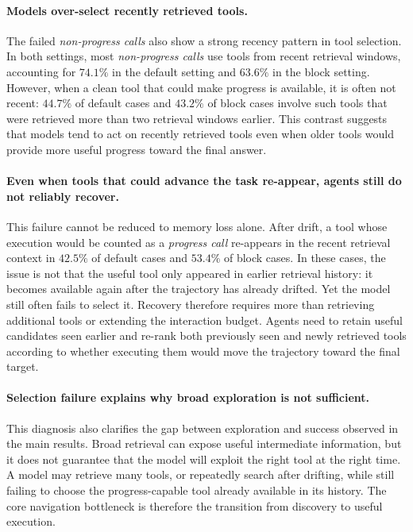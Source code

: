 \paragraph{Models over-select recently retrieved tools.}
The failed \textit{non-progress calls} also show a strong recency pattern in tool selection.
In both settings, most \textit{non-progress calls} use tools from recent retrieval windows, accounting for $74.1\%$ in the default setting and $63.6\%$ in the block setting.
However, when a clean tool that could make progress is available, it is often not recent: $44.7\%$ of default cases and $43.2\%$ of block cases involve such tools that were retrieved more than two retrieval windows earlier.
This contrast suggests that models tend to act on recently retrieved tools even when older tools would provide more useful progress toward the final answer.

\paragraph{Even when tools that could advance the task re-appear, agents still do not reliably recover.}
This failure cannot be reduced to memory loss alone.
After drift, a tool whose execution would be counted as a \textit{progress call} re-appears in the recent retrieval context in $42.5\%$ of default cases and $53.4\%$ of block cases.
In these cases, the issue is not that the useful tool only appeared in earlier retrieval history: it becomes available again after the trajectory has already drifted.
Yet the model still often fails to select it.
Recovery therefore requires more than retrieving additional tools or extending the interaction budget.
Agents need to retain useful candidates seen earlier and re-rank both previously seen and newly retrieved tools according to whether executing them would move the trajectory toward the final target.


\paragraph{Selection failure explains why broad exploration is not sufficient.}
This diagnosis also clarifies the gap between exploration and success observed in the main results.
Broad retrieval can expose useful intermediate information, but it does not guarantee that the model will exploit the right tool at the right time.
A model may retrieve many tools, or repeatedly search after drifting, while still failing to choose the progress-capable tool already available in its history.
The core navigation bottleneck is therefore the transition from discovery to useful execution.


